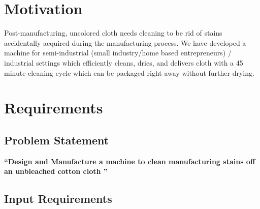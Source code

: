 \documentclass[12pt]{article}
\begin{document}
\section{Motivation}
Post-manufacturing, uncolored cloth needs cleaning to be rid of stains accidentally acquired during the manufacturing process. We have developed a machine for semi-industrial (small industry/home based entrepreneurs) / industrial settings which efficiently cleans, dries, and delivers cloth with a 45 minute cleaning cycle which can be packaged right away without further drying. 

% 


\section{Requirements}
\subsection{Problem Statement}
\begin{center}
    \textbf{``Design and Manufacture a machine to clean manufacturing stains off an unbleached cotton cloth ''}
\end{center}

\subsection{Input Requirements}
\end{document}
